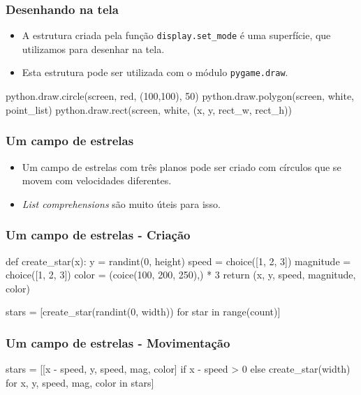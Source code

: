 \begin{frame}[fragile]
    \frametitle{Desenhando na tela}
    \begin{itemize}
        \item A estrutura criada pela função \texttt{display.set\_mode} é uma
        superfície, que utilizamos para desenhar na tela.
        \item Esta estrutura pode ser utilizada com o módulo \texttt{pygame.draw}.
    \end{itemize}
    \vfill
    \begin{python}
        python.draw.circle(screen, red, (100,100), 50)
        python.draw.polygon(screen, white, point_list)
        python.draw.rect(screen, white, (x, y, rect_w, rect_h))
    \end{python}
\end{frame}

\begin{frame}
    \frametitle{Um campo de estrelas}

    \begin{itemize}
        \item Um campo de estrelas com três planos pode ser criado com círculos
        que se movem com velocidades diferentes.
        \item \textit{List comprehensions} são muito úteis para isso.
    \end{itemize}
\end{frame}

\begin{frame}[fragile]
    \frametitle{Um campo de estrelas - Criação}

    \begin{python}
    def create_star(x):
        y = randint(0, height)
        speed = choice([1, 2, 3])
        magnitude = choice([1, 2, 3])
        color = (coice(100, 200, 250),) * 3
        return (x, y, speed, magnitude, color)

    stars = [create_star(randint(0, width)) for star in range(count)]
    \end{python}
\end{frame}

\begin{frame}[fragile]
    \frametitle{Um campo de estrelas - Movimentação}

    \begin{python}
    stars = [[x - speed, y, speed, mag, color]
             if x - speed > 0
             else create_star(width)
             for x, y, speed, mag, color in stars]
    \end{python}
\end{frame}

